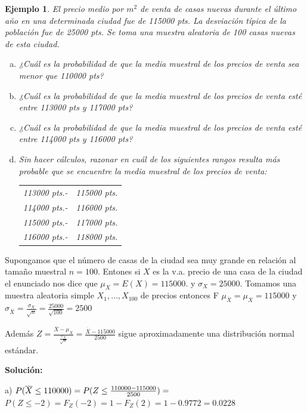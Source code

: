 \documentclass[12pt]{report}
\newtheorem{example}[definition]{Ejemplo}
\begin{document}
 \begin{example}
    El precio medio por $m^2$ de venta de casas nuevas durante el último año
    en una determinada ciudad  fue de 115000 pts. La desviación
    típica de la población fue de 25000 pts. Se toma una muestra
    aleatoria de 100 casas nuevas de esta ciudad.
    \begin{enumerate}[a)]
        \item ¿Cuál es la probabilidad de que la media muestral de los
        precios de venta sea menor que 110000 pts?
        \item ¿Cuál es la probabilidad de que la media muestral de los
        precios de venta esté entre 113000 pts y 117000 pts?
        \item¿Cuál es la probabilidad de que la media muestral de los
        precios de venta esté entre 114000 pts y 116000 pts?
        \item Sin hacer cálculos, razonar en cuál de los siguientes rangos
        resulta más probable que se encuentre la media muestral de los
        precios de venta:
        \begin{center}
        \begin{tabular}{ll}
        113000 pts.-&115000 pts.\\
        114000 pts.-&116000 pts.\\
        115000 pts.-&117000 pts.\\
        116000 pts.-&118000 pts.
            \end{tabular}
            \end{center}
        \end{enumerate}
 \end{example}

Supongamos que el número de casas de la ciudad sea  muy grande en relación al tamaño
muestral $n=100$. Entones si $X$ es  la v.a. precio de una casa de la ciudad el enunciado
nos dice que $\mu_{X}=E(X)=115000$. y $\sigma_{X}=25000$. Tomamos una muestra aleatoria simple
$X_{1},\ldots,X_{100}$ de precios entonces F $\mu_{\overline{X}}=\mu_{X}=115000$ y
$\sigma_{\overline{X}}= \frac{\sigma_{X}}{\sqrt{n}}=\frac{25000}{\sqrt{100}}=2500$

Además $Z=\frac{\overline{X}-\mu_{X}}{\frac{\sigma_{X}}{\sqrt{n}}}=
\frac{\overline{X}-115000}{2500}$
 sigue aproximadamente una distribución normal estándar.

     \textbf{Solución:}

 a) $P(\overline{X}\leq 110000)=\\ P(Z\leq \frac{110000-115000}{2500})=$
 $P(Z\leq -2)=F_{Z}(-2)=1-F_{Z}(2)=1-0.9772=0.0228$
\end{document}
